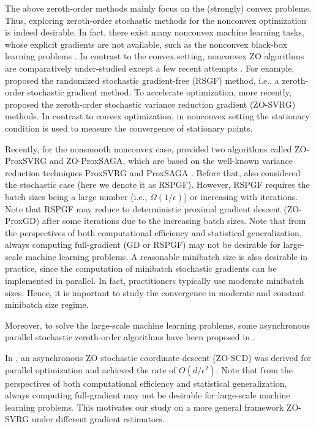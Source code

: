 \documentclass{article}
\theoremstyle{definition}
\theoremstyle{remark}
\begin{document}
{{{\color{Green} The above zeroth-order methods mainly focus on the
(strongly) convex problems. Thus, exploring zeroth-order stochastic methods for the nonconvex optimization is indeed desirable. In fact, there exist many nonconvex machine learning tasks, whose explicit gradients are not available, such as the nonconvex black-box learning problems \cite{chen2017zoo,liu2018zeroth}. 
{\color{Brown}
In contrast to the convex setting, nonconvex ZO algorithms are comparatively under-studied except
a few recent attempts \cite{lian2016comprehensive,nesterov2017random,
ghadimi2013stochastic,hajinezhad2017zeroth,gu2016zeroth,kazemi2018proximal}.
}
For example, \cite{ghadimi2013stochastic} proposed the randomized stochastic gradient-free (RSGF) method, i.e., a zeroth-order stochastic gradient method. To accelerate optimization, more recently, \cite{liu2018stochastic,liu2018zeroth} proposed the zeroth-order stochastic variance reduction gradient (ZO-SVRG)
methods. 
{\color{Brown}
In contrast to convex optimization, in nonconvex setting the stationary condition is used to measure the convergence of stationary points.
}
{\color{Violet}
Recently, for the nonsmooth nonconvex case, \cite{huang2019faster} provided two algorithms called ZO-ProxSVRG and ZO-ProxSAGA, which are based on the well-known variance reduction techniques ProxSVRG and ProxSAGA \cite{reddi2016proximal}. Before that,  \cite{ghadimi2013stochastic} also considered the stochastic case (here we denote
it as RSPGF). However, RSPGF requires the batch sizes being a large number (i.e., $\Omega(1/\epsilon)$) or increasing with
iterations. Note that RSPGF may reduce to deterministic proximal gradient descent (ZO-ProxGD) after some iterations due to the
increasing batch sizes. Note that from the perspectives of both computational efficiency and statistical generalization,
always computing full-gradient (GD or RSPGF) may not be desirable for large-scale machine learning problems. A reasonable minibatch size is also desirable in practice, since the computation of minibatch stochastic gradients can be
implemented in parallel. In fact, practitioners typically use moderate minibatch sizes. Hence, it is important to study the convergence in moderate and constant minibatch size regime.

}
Moreover, to solve the large-scale machine learning problems, some asynchronous parallel stochastic zeroth-order algorithms have been proposed in \cite{gu2018inexact,lian2016comprehensive,gu2018faster}.
}
In \cite{lian2016comprehensive}, an asynchronous ZO stochastic coordinate
descent (ZO-SCD) was derived for parallel optimization and achieved the rate of $O(d/\epsilon^2)$. {\color{Violet} Note that from the perspectives of both computational efficiency and statistical generalization, always computing full-gradient may not be desirable for large-scale machine learning problems.} This motivates our study on a more general framework ZO-SVRG under different gradient estimators.
}

}
\end{document}
